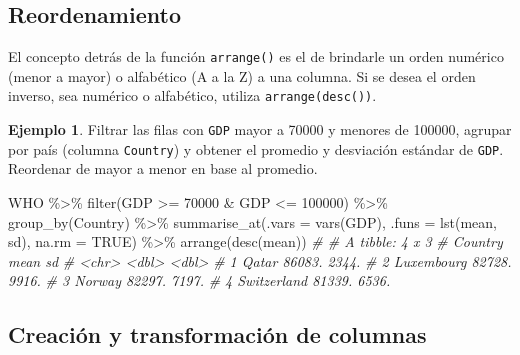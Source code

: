 \documentclass[
]{article}
\newenvironment{Shaded}{\begin{snugshade}}{\end{snugshade}}
\newcommand{\AttributeTok}[1]{\textcolor[rgb]{0.77,0.63,0.00}{#1}}
\newcommand{\CommentTok}[1]{\textcolor[rgb]{0.56,0.35,0.01}{\textit{#1}}}
\newcommand{\ConstantTok}[1]{\textcolor[rgb]{0.00,0.00,0.00}{#1}}
\newcommand{\DecValTok}[1]{\textcolor[rgb]{0.00,0.00,0.81}{#1}}
\newcommand{\FunctionTok}[1]{\textcolor[rgb]{0.00,0.00,0.00}{#1}}
\newcommand{\NormalTok}[1]{#1}
\newcommand{\SpecialCharTok}[1]{\textcolor[rgb]{0.00,0.00,0.00}{#1}}
\theoremstyle{definition}
\theoremstyle{definition}
\newtheorem{example}{Ejemplo}[section]
\theoremstyle{definition}
\theoremstyle{definition}
\theoremstyle{remark}
\begin{document}
\hypertarget{reordenamiento}{%
\subsection{Reordenamiento}\label{reordenamiento}}

El concepto detrás de la función \texttt{arrange()} es el de brindarle un orden numérico (menor a mayor) o alfabético (A a la Z) a una columna. Si se desea el orden inverso, sea numérico o alfabético, utiliza \texttt{arrange(desc())}.

\begin{example}

Filtrar las filas con \texttt{GDP} mayor a 70000 y menores de 100000, agrupar por país (columna \texttt{Country}) y obtener el promedio y desviación estándar de \texttt{GDP}. Reordenar de mayor a menor en base al promedio.

\begin{Shaded}
\begin{Highlighting}[]
\NormalTok{WHO }\SpecialCharTok{\%\textgreater{}\%} 
  \FunctionTok{filter}\NormalTok{(GDP }\SpecialCharTok{\textgreater{}=} \DecValTok{70000} \SpecialCharTok{\&}\NormalTok{ GDP }\SpecialCharTok{\textless{}=} \DecValTok{100000}\NormalTok{) }\SpecialCharTok{\%\textgreater{}\%} 
  \FunctionTok{group\_by}\NormalTok{(Country) }\SpecialCharTok{\%\textgreater{}\%} 
  \FunctionTok{summarise\_at}\NormalTok{(}\AttributeTok{.vars =} \FunctionTok{vars}\NormalTok{(GDP), }\AttributeTok{.funs =} \FunctionTok{lst}\NormalTok{(mean, sd), }\AttributeTok{na.rm =} \ConstantTok{TRUE}\NormalTok{) }\SpecialCharTok{\%\textgreater{}\%} 
  \FunctionTok{arrange}\NormalTok{(}\FunctionTok{desc}\NormalTok{(mean))}
\CommentTok{\# \# A tibble: 4 x 3}
\CommentTok{\#   Country       mean    sd}
\CommentTok{\#   \textless{}chr\textgreater{}        \textless{}dbl\textgreater{} \textless{}dbl\textgreater{}}
\CommentTok{\# 1 Qatar       86083. 2344.}
\CommentTok{\# 2 Luxembourg  82728. 9916.}
\CommentTok{\# 3 Norway      82297. 7197.}
\CommentTok{\# 4 Switzerland 81339. 6536.}
\end{Highlighting}
\end{Shaded}

\end{example}

\hypertarget{creaciuxf3n-y-transformaciuxf3n-de-columnas}{%
\subsection{Creación y transformación de columnas}\label{creaciuxf3n-y-transformaciuxf3n-de-columnas}}
\end{document}
